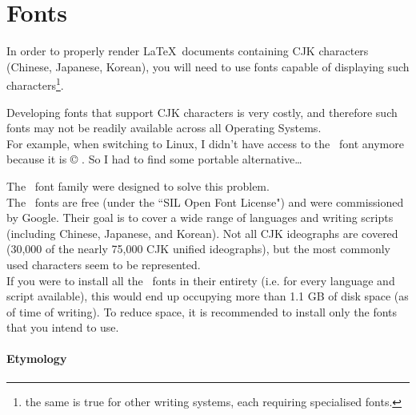 
\part{Fonts} \label{fonts}

\renewcommand{\currentPart}{Fonts}


In order to properly render \LaTeX\ documents containing CJK characters (Chinese, Japanese, Korean), you will need to use fonts capable of displaying such characters\footnote{the same is true for other writing systems, each requiring specialised fonts.}.

Developing fonts that support CJK characters is very costly, and therefore such fonts may not be readily available across all Operating Systems. \\

For example, when switching to Linux, I didn't have access to the \Meiryo\ font anymore because it is © \MicrosoftCorp. So I had to find some portable alternative\dots

The \Noto\ font family \citep{noto-fonts} were designed to solve this problem. \\

The \Noto\ fonts are free (under the ``SIL Open Font License") and were commissioned by Google. Their goal is to cover a wide range of languages and writing scripts (including Chinese, Japanese, and Korean). Not all CJK ideographs are covered (30,000 of the nearly 75,000 CJK unified ideographs), but the most commonly used characters seem to be represented. \citep{wiki-noto} \\

If you were to install all the \Noto\ fonts in their entirety (i.e. for every language and script available), this would end up occupying more than 1.1 GB of disk space (as of time of writing).
To reduce space, it is recommended to install only the fonts that you intend to use.


\subsection*{Etymology}


